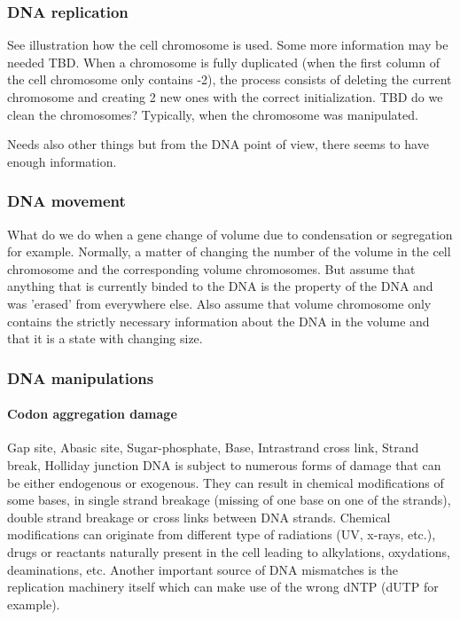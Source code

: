 \subsubsection{DNA replication}
See illustration how the cell chromosome is used. Some more information may be needed TBD.
When a chromosome is fully duplicated (when the first column of the cell chromosome only contains -2), the process consists of deleting the current chromosome and creating 2 new ones with the correct initialization. TBD do we clean the chromosomes? Typically, when the chromosome was manipulated.

Needs also other things but from the DNA point of view, there seems to have enough information.

\subsubsection{DNA movement}
\textcolor[rgb]{1.00,0.00,0.00}{What do we do when a gene change of volume due to condensation or segregation for example. Normally, a matter of changing the number of the volume in the cell chromosome and the corresponding volume chromosomes. But assume that anything that is currently binded to the DNA is the property of the DNA and was 'erased' from everywhere else. Also assume that volume chromosome only contains the strictly necessary information about the DNA in the volume and that it is a state with changing size.}

\subsubsection{DNA manipulations}
\paragraph{Codon aggregation damage}
\textcolor[rgb]{1.00,0.00,0.00}{Gap site, Abasic site, Sugar-phosphate, Base, Intrastrand cross link, Strand break, Holliday junction}
DNA is subject to numerous forms of damage that can be either endogenous or exogenous. They can result in chemical modifications of some bases, in single strand breakage (missing of one base on one of the strands), double strand breakage or cross links between DNA strands. Chemical modifications can originate from different type of radiations (UV, x-rays, etc.), drugs or reactants naturally present in the cell leading to alkylations, oxydations, deaminations, etc. Another important source of DNA mismatches is the replication machinery itself which can make use of the wrong dNTP (dUTP for example).

